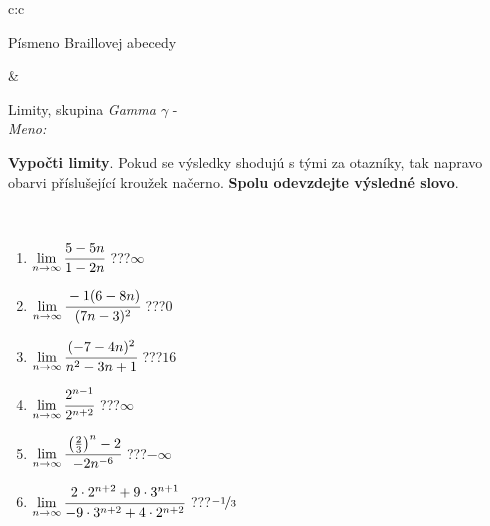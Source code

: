 \documentclass[10pt]{report}
\begin{document}
\begin{tabular}{c:c}
\begin{minipage}[c][104.5mm][t]{0.5\linewidth}
\begin{center}
\begin{minipage}{0.20\linewidth}
\begin{center}
{\small Písmeno Braillovej abecedy}
\end{center}
\end{minipage}
\end{center}
\end{minipage}
&
\begin{minipage}[c][104.5mm][t]{0.5\linewidth}
\begin{center}
\vspace{7mm}
{\huge Limity, skupina \textit{Gamma $\gamma$} -}\\[5mm]
\textit{Meno:}\phantom{xxxxxxxxxxxxxxxxxxxxxxxxxxxxxxxxxxxxxxxxxxxxxxxxxxxxxxxxxxxxxxxxx}\\[5mm]
\begin{minipage}{0.95\linewidth}
\begin{center}
\textbf{Vypočti limity}. Pokud se výsledky shodujú s tými za otazníky, tak napravo\\obarvi příslušející kroužek načerno. \textbf{Spolu odevzdejte výsledné slovo}.
\end{center}
\end{minipage}
\\[1mm]
\begin{minipage}{0.79\linewidth}
\begin{center}
\begin{varwidth}{\linewidth}
\begin{enumerate}
\normalsize
\item $\lim\limits_{n\to\infty}\cfrac{5-5n}{1-2n}$\quad \dotfill\; ???\;\dotfill \quad $\infty$
\item $\lim\limits_{n\to\infty}\cfrac{-1(6-8n)}{(7n-3)^2}$\quad \dotfill\; ???\;\dotfill \quad $0$
\item $\lim\limits_{n\to\infty}\cfrac{(-7-4n)^2}{n^2-3n+1}$\quad \dotfill\; ???\;\dotfill \quad $16$
\item $\lim\limits_{n\to\infty}\cfrac{2^{n-1}}{2^{n+2}}$\quad \dotfill\; ???\;\dotfill \quad $\infty$
\item $\lim\limits_{n\to\infty}\cfrac{\left(\frac{2}{3}\right)^n -2}{-2n^{-6}}$\quad \dotfill\; ???\;\dotfill \quad $-\infty$
\item $\lim\limits_{n\to\infty}\cfrac{2\cdot 2^{n+2}+9\cdot 3^{n+1}}{-9\cdot 3^{n+2}+4\cdot 2^{n+2}}$\quad \dotfill\; ???\;\dotfill \quad $\nicefrac{-1}{3}$
\end{enumerate}
\end{varwidth}
\end{center}
\end{minipage}
\begin{minipage}{0.20\linewidth}

\end{minipage}
\end{center}
\end{minipage}
\end{tabular}
\end{document}
